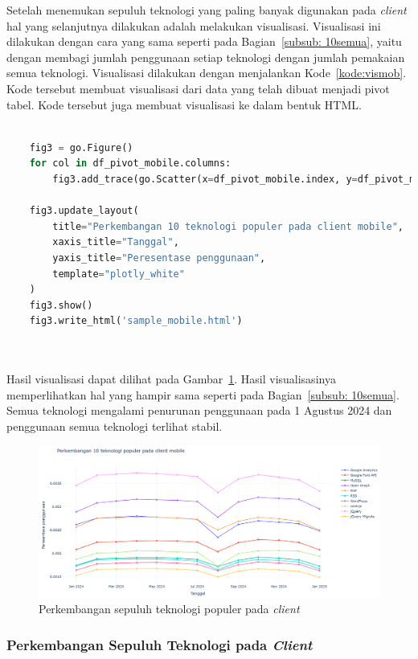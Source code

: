 Setelah menemukan sepuluh teknologi yang paling banyak digunakan pada \textit{client} \mobile hal yang selanjutnya dilakukan adalah melakukan visualisasi. Visualisasi ini dilakukan dengan cara yang sama seperti pada Bagian~\ref{subsub: 10semua}, yaitu dengan membagi jumlah penggunaan setiap teknologi dengan jumlah pemakaian semua teknologi. Visualisasi dilakukan dengan menjalankan Kode~\ref{kode:vismob}. Kode tersebut membuat visualisasi dari data yang telah dibuat menjadi pivot tabel. Kode tersebut juga membuat visualisasi ke dalam bentuk HTML.

\begin{lstlisting}[language = Python,caption=Kode untuk membuat visualisasi pada \textit{client} \mobile,label=kode:vismob]

    fig3 = go.Figure()
    for col in df_pivot_mobile.columns:
        fig3.add_trace(go.Scatter(x=df_pivot_mobile.index, y=df_pivot_mobile[col], mode='lines+markers', name=col))
        
    fig3.update_layout(
        title="Perkembangan 10 teknologi populer pada client mobile",
        xaxis_title="Tanggal",
        yaxis_title="Peresentase penggunaan",
        template="plotly_white"
    )
    fig3.show()
    fig3.write_html('sample_mobile.html')

    
\end{lstlisting}

Hasil visualisasi dapat dilihat pada Gambar~\ref{fig:10mobile}. Hasil visualisasinya memperlihatkan hal yang hampir sama seperti pada Bagian~\ref{subsub: 10semua}. Semua teknologi mengalami penurunan penggunaan pada 1 Agustus 2024 dan penggunaan semua teknologi terlihat stabil.
\begin{figure}[H]
    \centering
    \includegraphics[width=0.7\linewidth]{Gambar/perkembangan 10 teknologi mobile.png}
    \caption{Perkembangan sepuluh teknologi populer pada \textit{client} \mobile}
    \label{fig:10mobile}
\end{figure}

\subsubsection{Perkembangan Sepuluh Teknologi pada \textit{Client} \desktop}

